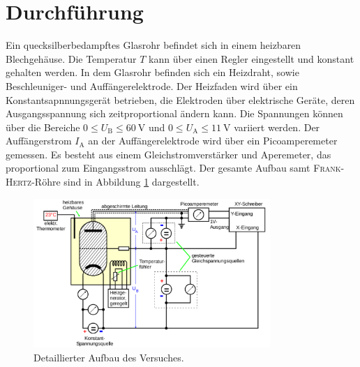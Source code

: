 \section{Durchführung}
\label{sec:Durchfuehrung}
Ein quecksilberbedampftes Glasrohr befindet sich in einem heizbaren Blechgehäuse. Die Temperatur $T$ kann über einen Regler eingestellt und konstant gehalten werden. In dem Glasrohr befinden sich ein Heizdraht, sowie Beschleuniger- und Auffängerelektrode.
Der Heizfaden wird über ein Konstantsapnnungsgerät betrieben, die Elektroden über elektrische Geräte, deren Ausgangsspannung sich zeitproportional ändern kann. 
Die Spannungen können über die Bereiche $0\leq U_\mathup{B} \leq \SI{60}{\volt}$ und $0\leq U_\mathup{A}\leq \SI{11}{\volt}$ variiert werden. Der Auffängerstrom $I_\mathup{A}$ an der Auffängerelektrode wird über ein Picoamperemeter gemessen.
Es besteht aus einem Gleichstromverstärker und Aperemeter, das proportional zum Eingangsstrom ausschlägt. 
Der gesamte Aufbau samt \textsc{Frank}-\textsc{Hertz}-Röhre sind in Abbildung \ref{fig:aufbau} dargestellt.
\begin{figure}
	\centering
	\includegraphics[width=0.8\textwidth]{Bilder/Aufbau_Detail.pdf}
	\caption{Detaillierter Aufbau des Versuches.}
	\label{fig:aufbau}
\end{figure}
